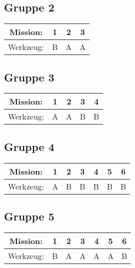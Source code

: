 \documentclass[]{article}
\begin{document}
\subsection*{Gruppe 2}
\begin{tabular}{|c|c|c|c|}
\hline
Mission: & 1 & 2 & 3\\
\hline
Werkzeug: & B & A & A\\
\hline
\end{tabular}


\subsection*{Gruppe 3}
\begin{tabular}{|c|c|c|c|c|}
\hline
Mission: & 1 & 2 & 3 & 4\\
\hline
Werkzeug: & A & A & B & B\\
\hline
\end{tabular}


\subsection*{Gruppe 4}
\begin{tabular}{|c|c|c|c|c|c|c|}
\hline
Mission: & 1 & 2 & 3 & 4 & 5 & 6\\
\hline
Werkzeug: & A & B & B & B & B & B\\
\hline
\end{tabular}


\subsection*{Gruppe 5}
\begin{tabular}{|c|c|c|c|c|c|c|}
\hline
Mission: & 1 & 2 & 3 & 4 & 5 & 6\\
\hline
Werkzeug: & B & A & A & A & A & B\\
\hline
\end{tabular}
\end{document}
